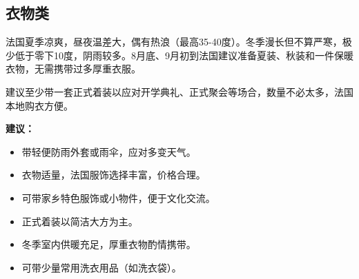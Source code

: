 \subsection{衣物类}

法国夏季凉爽，昼夜温差大，偶有热浪（最高35-40度）。冬季漫长但不算严寒，极少低于零下10度，阴雨较多。8月底、9月初到法国建议准备夏装、秋装和一件保暖衣物，无需携带过多厚重衣服。

建议至少带一套正式着装以应对开学典礼、正式聚会等场合，数量不必太多，法国本地购衣方便。

\textbf{建议：}
\begin{itemize}
    \item 带轻便防雨外套或雨伞，应对多变天气。
    \item 衣物适量，法国服饰选择丰富，价格合理。
    \item 可带家乡特色服饰或小物件，便于文化交流。
    \item 正式着装以简洁大方为主。
    \item 冬季室内供暖充足，厚重衣物酌情携带。
    \item 可带少量常用洗衣用品（如洗衣袋）。
\end{itemize}
